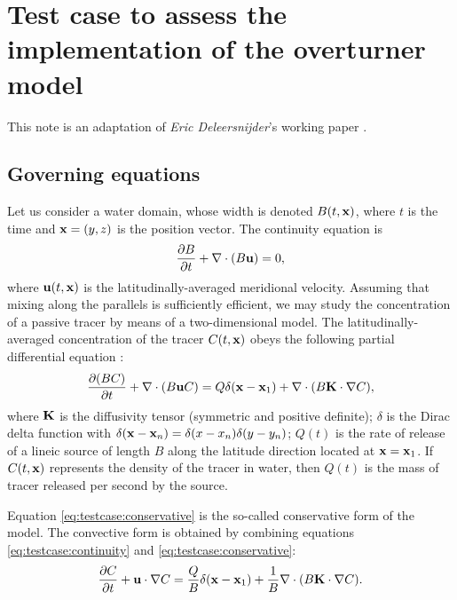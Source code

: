 \section{Test case to assess the implementation of the overturner model}
This note is an adaptation of \textit{Eric Deleersnijder}'s working paper \cite{deleersnijder2011test}.

\subsection{Governing equations}
Let us consider a water domain, whose width is denoted $B(t,\mathbf{x})$, where $t$ is the time and $\mathbf{x} = (y,z)$ is the position vector. The continuity equation is
\begin{equation} \label{eq:testcase:continuity}
	\frac{\partial B}{\partial t} + \nabla \cdot (B\mathbf{u}) = 0,
\end{equation}
where $\mathbf{u}(t,\mathbf{x})$ is the latitudinally-averaged meridional velocity. Assuming that mixing along the parallels is sufficiently efficient, we may study the concentration of a passive tracer by means of a two-dimensional model. The latitudinally-averaged concentration of the tracer $C(t,\mathbf{x})$ obeys the following partial differential equation :
\begin{equation} \label{eq:testcase:conservative}
	\frac{\partial (BC)}{\partial t} + \nabla \cdot (B \mathbf{u} C) = Q\delta(\mathbf{x} - \mathbf{x}_1) + \nabla \cdot (B\mathbf{K} \cdot \nabla C), 
\end{equation}
where $\mathbf{K}$ is the diffusivity tensor (symmetric and positive definite); $\delta$ is the Dirac delta function with $\delta(\mathbf{x}-\mathbf{x}_n) = \delta(x-x_n)\delta(y-y_n)$; $Q(t)$ is the rate of release of a lineic source of length $B$ along the latitude direction located at $\mathbf{x} = \mathbf{x}_1$. If $C(t,\mathbf x)$ represents the 
density of the tracer in water, then $Q(t)$ is the mass of tracer released per second by the source.

Equation \eqref{eq:testcase:conservative} is the so-called conservative form of the model. The convective form is obtained by combining equations \eqref{eq:testcase:continuity} and \eqref{eq:testcase:conservative}:
\begin{equation}  \label{eq:testcase:convective}
	\frac{\partial C}{\partial t} + \mathbf{u} \cdot \nabla C = \frac{Q}{B} \delta(\mathbf{x} - \mathbf{x}_1) + \frac{1}{B} \nabla \cdot (B\mathbf{K} \cdot \nabla C).
\end{equation}

